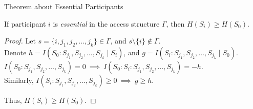 \documentclass[aspectratio=169]{beamer}
\newcommand{\seqn}[2]{{#1}_1,{#1}_2,\dotsc,{#1}_{#2}}
\newcommand{\seqin}[3]{{#1}_{{#2}_1},{#1}_{{#2}_2},\dotsc,{#1}_{{#2}_{#3}}}
\begin{document}
\begin{frame}{Theorem about Essential Participants}
    \begin{theorem}
        If participant $i$ is \emph{essential} in the access structure $\Gamma$, then $H(S_i) \ge H(S_0)$.
    \end{theorem}

    \begin{proof}
        Let $s=\{i, \seqn{j}{k}\} \in \Gamma$, and $s \setminus \{i\} \not\in \Gamma$.\\
        Denote $h = I(S_0 : \seqin{S}{j}{k} \mid S_i)$,
        and $g = I(S_i : \seqin{S}{j}{k} \mid S_0)$.\\
        $I(S_0 : \seqin{S}{j}{k}) = 0\ \implies\ I(S_0 : S_i : \seqin{S}{j}{k}) = -h$.\\
        Similarly, $I(S_i : \seqin{S}{j}{k}) \ge 0 \ \implies\ g \ge h$.

        \begin{center}
        \end{center}
        Thus, $H(S_i) \ge H(S_0)$.
    \end{proof}

\end{frame}
\end{document}
